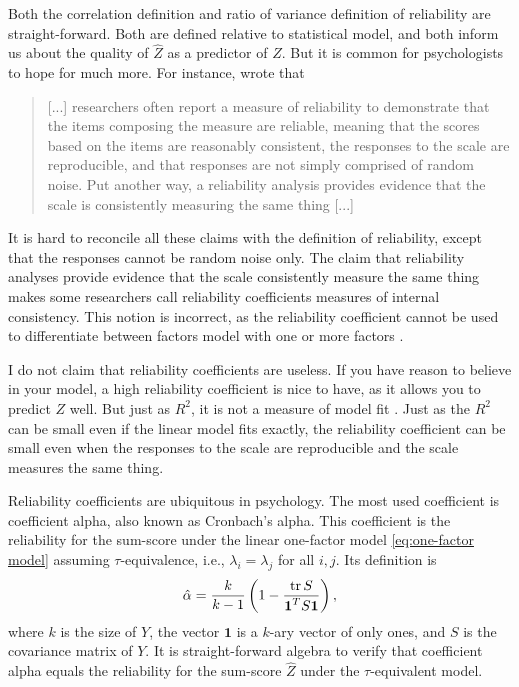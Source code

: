 Both the correlation definition and ratio of variance definition of reliability are straight-forward. Both are defined relative to statistical model, and both inform us about the quality of $\hat{Z}$ as a predictor of $Z$. But it is common for psychologists to hope for much more. For instance, \textcite{McNeish2018-vu} wrote that
\begin{quote} 
[...] researchers often report a measure of reliability to demonstrate that the items composing the measure are reliable, meaning that the scores based on the items are reasonably consistent, the responses to the scale are reproducible, and that responses are not simply comprised of random noise. Put another way, a reliability analysis provides evidence that the scale is consistently measuring the same thing [...]
\end{quote}

It is hard to reconcile all these claims with the definition of reliability, except that the responses cannot be random noise only. The claim that reliability analyses provide evidence that the scale consistently measure the same thing makes some researchers call reliability coefficients measures of internal consistency. This notion is incorrect, as the reliability coefficient cannot be used to differentiate between factors model with one or more factors \parencite[]{McDonald1981-xz}.

I do not claim that reliability coefficients are useless. If you have reason to believe in your model, a high reliability coefficient is nice to have, as it allows you to predict $Z$ well. But just as $R^2$, it is not a measure of model fit \parencite{Helland1987-eb}. Just as the $R^2$ can be small even if the linear model fits exactly, the reliability coefficient can be small even when the responses to the scale are reproducible and the scale measures the same thing. 

Reliability coefficients are ubiquitous in psychology. The most used coefficient is coefficient alpha, also known as Cronbach's alpha. This coefficient is the reliability for the sum-score under the linear one-factor model \eqref{eq:one-factor model} assuming $\tau$-equivalence, i.e., $\lambda_i = \lambda_j$ for all $i,j$. Its definition is 
\begin{equation}
\hat{\alpha}=\frac{k}{k-1}\left(1-\frac{\operatorname{tr}{S}}{\boldsymbol{1}^{T}S\boldsymbol{1}}\right),\label{eq:sample coefficient alpha}
\end{equation}
where $k$ is the size of $Y$, the vector $\boldsymbol{1}$ is a $k$-ary vector of only ones, and $S$ is the covariance matrix of $Y$. It is straight-forward algebra to verify that coefficient alpha equals the reliability for the sum-score $\hat{Z}$ under the $\tau$-equivalent model.

